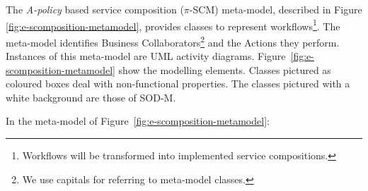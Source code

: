 

The {\em A-policy} based service composition ($\pi$-SCM) meta-model, described in Figure \ref{fig:e-scomposition-metamodel},
provides classes to represent workflows\footnote{Workflows will be transformed into implemented service compositions.}.
The meta-model identifies {\sc Business Collaborators}\footnote{We use {\sc capitals} for referring to meta-model classes.} and the {\sc Actions} they perform. 
Instances of this meta-model are UML activity diagrams. 
Figure~\ref{fig:e-scomposition-metamodel} show the modelling elements.
Classes pictured as coloured boxes deal with non-functional properties.
The classes pictured with a white background are those of SOD-M.

In the meta-model of Figure~\ref{fig:e-scomposition-metamodel}:
